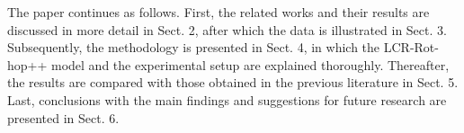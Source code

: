 The paper continues as follows. First, the related works and their results are discussed in more detail in Sect. 2, after which the data is illustrated in Sect. 3. Subsequently, the methodology is presented in Sect. 4, in which the LCR-Rot-hop++ model and the experimental setup are explained thoroughly. Thereafter, the results are compared with those obtained in the previous literature in Sect. 5. Last, conclusions with the main findings and suggestions for future research are presented in Sect. 6.




